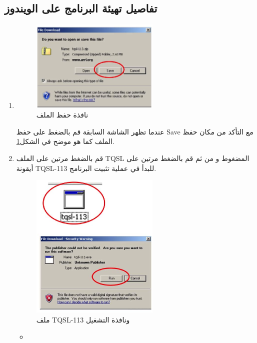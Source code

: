 \documentclass[a4paper,12pt]{article}
\begin{document}
\subsection{تفاصيل تهيئة البرنامج على الويندوز}
		\begin{enumerate}
		\item
			\begin{figure}[!hbtp]
			\centering
			\includegraphics[width=0.58\textwidth]{win_save.eps}
			\caption{نافذة حفظ الملف}
			\label{fig:Save}
			\end{figure}
			عندما تظهر الشاشة السابقة قم بالضغط على حفظ \textenglish{Save} مع التأكد من مكان حفظ
		الملف كما هو موضح في الشكل\ref{fig:Save}.
		\item
			قم بالضغط مرتين على الملف \textenglish{TQSL} المضغوط و من ثم قم بالضغط مرتين على
		أيقونة \textenglish{TQSL-113} للبدأ في عملية تثبيت البرنامج.
\clearpage
			\begin{figure}[!hbtp]
			\centering
			\includegraphics[width=0.58\textwidth]{tqsl113run.eps}
			\caption{ملف TQSL-113 ونافذة التشغيل}
			\label{fig:Run Window}
			\end{figure}
			\begin{itemize}
				\item

\end{itemize}
\end{enumerate}
\end{document}

